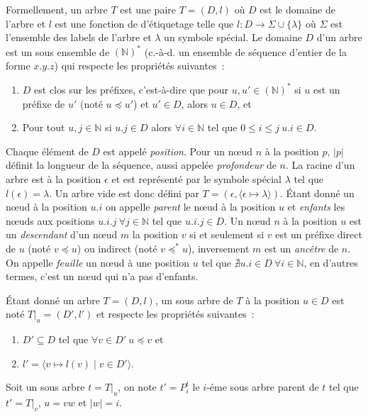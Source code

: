 \begin{definition}
    \label{def:struct:tree}
    Formellement, un arbre $T$ est une paire $T = (D, l)$ où $D$ est le domaine de l'arbre et $l$ est une fonction de d'étiquetage telle que $l : D \to \Sigma \cup \{\lambda\}$ où $\Sigma$ est l'ensemble des labels de l'arbre et $\lambda$ un symbole spécial.
    Le domaine $D$ d'un arbre est un sous ensemble de $(\mathbb{N})^*$ (c.-à-d. un ensemble de séquence d'entier de la forme $x.y.z$) qui respecte les propriétés suivantes :
    \begin{enumerate}
        \item $D$ est clos sur les préfixes, c'est-à-dire que pour $u, u' \in (\mathbb{N})^*$ si $u$ est un préfixe de $u'$ (noté $u \preceq u'$) et $u' \in D$, alors $u \in D$, et
        \item Pour tout $u, j \in \mathbb{N}$ si $u.j \in D$ alors $\forall i \in \mathbb{N}$ tel que $0 \leq i \leq j ~ u.i \in D$.
    \end{enumerate}
    Chaque élément de $D$ est appelé \emph{position}.
    Pour un nœud $n$ à la position $p$, $|p|$ définit la longueur de la séquence, aussi appelée \emph{profondeur} de $n$.
    La racine d'un arbre est à la position $\epsilon$ et est représenté par le symbole spécial $\lambda$ tel que $l(\epsilon) = \lambda$.
    Un arbre vide est donc défini par  $T = (\epsilon, \langle \epsilon \mapsto \lambda \rangle)$.
    Étant donné un nœud à la position $u.i$ on appelle \emph{parent} le nœud à la position $u$ et \emph{enfants} les nœuds aux positions $u.i.j ~ \forall j \in \mathbb{N}$ tel que $u.i.j \in D$.
    Un nœud $n$ à la position $u$ est un \emph{descendant} d'un nœud $m$ la position $v$ si et seulement si $v$ est un préfixe direct de $u$ (noté $v \preceq u$) ou indirect (noté $v \preceq^* u$), inversement $m$ est un \emph{ancêtre} de $n$.
    On appelle \emph{feuille} un nœud à une position $u$ tel que $\nexists u.i \in D ~ \forall i \in \mathbb{N}$, en d'autres termes, c'est un nœud qui n'a pas d'enfants.
\end{definition}

\begin{definition}
    Étant donné un arbre $T = (D, l)$, un sous arbre de $T$ à la position $u \in D$ est noté $T|_u = (D', l')$ et respecte les propriétés suivantes :
    \begin{enumerate}
        \item $D' \subseteq D$ tel que $\forall v \in D' ~ u \preceq v$ et
        \item $l' = \langle v \mapsto l(v) \mid v \in D' \rangle $.
    \end{enumerate}
    Soit un sous arbre $t = T|_u$, on note $t' = P_i^t$ le $i$-éme sous arbre parent de $t$ tel que $t' = T|_v$,  $u = vw$ et $|w| = i$.
\end{definition}

